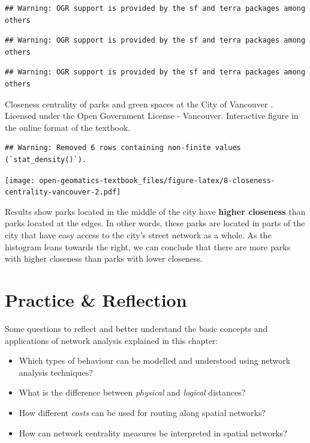 \documentclass[
]{book}
\providecommand{\tightlist}{%
  \setlength{\itemsep}{0pt}\setlength{\parskip}{0pt}}
\begin{document}
\begin{verbatim}
## Warning: OGR support is provided by the sf and terra packages among others
\end{verbatim}

\begin{verbatim}
## Warning: OGR support is provided by the sf and terra packages among others
\end{verbatim}

\begin{verbatim}
## Warning: OGR support is provided by the sf and terra packages among others
\end{verbatim}

\label{fig:8-closeness-centrality-vancouver}Closeness centrality of parks and green spaces at the City of Vancouver \citep{city_of_vancouver_open_nodate}. Licensed under the Open Government License - Vancouver. Interactive figure in the online format of the textbook.

\begin{verbatim}
## Warning: Removed 6 rows containing non-finite values (`stat_density()`).
\end{verbatim}

\texttt{[image: open-geomatics-textbook\_files/figure-latex/8-closeness-centrality-vancouver-2.pdf]}

Results show parks located in the middle of the city have \textbf{higher closeness} than parks located at the edges. In other words, these parks are located in parts of the city that have easy access to the city's street network as a whole. As the histogram leans towards the right, we can conclude that there are more parks with higher closeness than parks with lower closeness.

\hypertarget{practice-reflection}{%
\section*{Practice \& Reflection}\label{practice-reflection}}

Some questions to reflect and better understand the basic concepts and applications of network analysis explained in this chapter:

\begin{itemize}
\tightlist
\item
  Which types of behaviour can be modelled and understood using network analysis techniques?
\item
  What is the difference between \emph{physical} and \emph{logical} distances?
\item
  How different \emph{costs} can be used for routing along spatial networks?
\item
  How can network centrality measures be interpreted in spatial networks?
\end{itemize}
\end{document}
